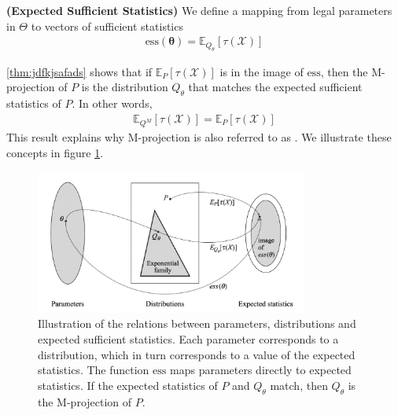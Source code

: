 \documentclass{article}
\newcommand{\bfs}[1]{\textbf{({#1}) }}
\begin{document}
\begin{defa}\bfs{Expected Sufficient Statistics}
We define a mapping from legal parameters in $\Theta$ to vectors of sufficient statistics
\begin{align*}
\mathrm{ess}(\boldsymbol{\theta})=\mathbb{E}_{Q_{\theta}}[\tau(\mathcal{X})]
\end{align*}
\end{defa} 

\cref{thm:jdfkjsafads} shows that if $\mathbb{E}_{P}[\tau(\mathcal{X})]$ is in the image of $\mathrm{ess}$, then the M-projection of $P$ is the distribution $Q_{\theta}$ that matches the expected sufficient statistics of $P$. In other words,
\begin{align*}
\mathbb{E}_{Q^{M}}[\tau(\mathcal{X})]=\mathbb{E}_{P}[\tau(\mathcal{X})]
\end{align*}
This result explains why M-projection is also referred to as .  We illustrate these concepts in figure \cref{fig:aod2qa}.

 \begin{figure}[H]
    \centering
    \includegraphics[width=0.8\textwidth]{Figs/a28.png}
    \caption{Illustration of the relations between parameters, distributions and expected sufficient statistics. Each parameter corresponds to a distribution, which in turn corresponds to a value of the expected statistics. The function $\mathrm{ess}$ maps parameters directly to expected statistics. If the expected statistics of $P$ and $Q_{\theta}$ match, then $Q_{\theta}$ is the M-projection of $P$.}
    \label{fig:aod2qa}
\end{figure}
\end{document}
